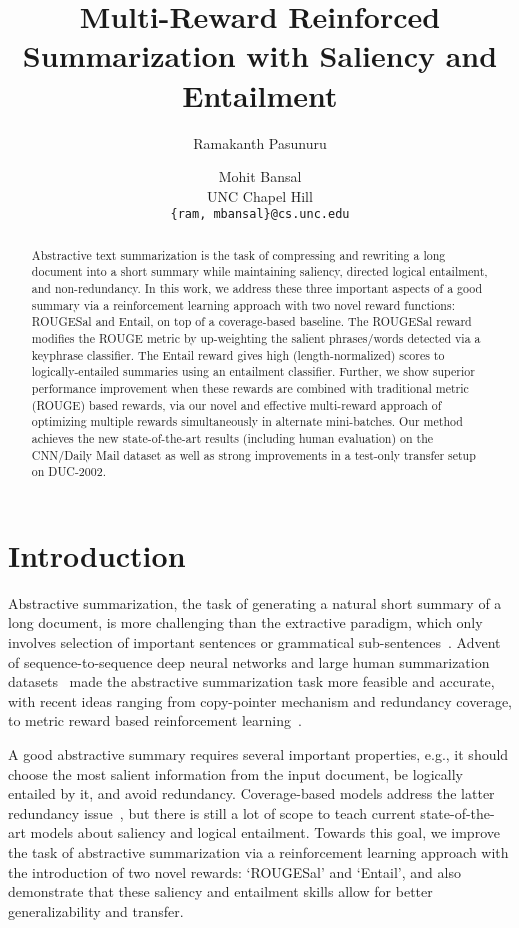 \documentclass[11pt,a4paper]{article}
\title{Multi-Reward Reinforced Summarization with Saliency and Entailment}
\author{Ramakanth Pasunuru \and Mohit Bansal \\
  UNC Chapel Hill \\
  {\tt \{ram, mbansal\}@cs.unc.edu} \\
 }
\date{}
\begin{document}
\maketitle
\begin{abstract}
Abstractive text summarization is the task of compressing and rewriting a long document into a short summary while maintaining saliency, directed logical entailment, and non-redundancy. In this work, we address these three important aspects of a good summary via a reinforcement learning approach with two novel reward functions: ROUGESal and Entail, on top of a coverage-based baseline. The ROUGESal reward modifies the ROUGE metric by up-weighting the salient phrases/words detected via a keyphrase classifier. The Entail reward gives high (length-normalized) scores to logically-entailed summaries using an entailment classifier. Further, we show superior performance improvement when these rewards are combined with traditional metric (ROUGE) based rewards, via our novel and effective multi-reward approach of optimizing multiple rewards simultaneously in alternate mini-batches. Our method achieves the new state-of-the-art results (including human evaluation) on the CNN/Daily Mail dataset as well as strong improvements in a test-only transfer setup on DUC-2002.





\end{abstract}

\section{Introduction}
\label{sec-intro}


Abstractive summarization, the task of generating a natural short summary of a long document, is more challenging than the extractive paradigm, which only involves selection of important sentences or grammatical sub-sentences~\cite{jing2000sentence,knight2002summarization,clarke2008global,filippova2015sentence}. Advent of sequence-to-sequence deep neural networks and large human summarization datasets~\cite{hermann2015teaching,nallapati2016abstractive} made the abstractive summarization task more feasible and accurate,  with recent ideas ranging from copy-pointer mechanism and redundancy coverage, to metric reward based reinforcement learning~\cite{rush2015neural,chopra2016abstractive,ranzato2015sequence,nallapati2016abstractive,see2017get}.

A good abstractive summary requires several important properties, e.g., it should choose the most salient information from the input document, be logically entailed by it, and avoid redundancy. Coverage-based models address the latter redundancy issue~\cite{Suzuki2016Summ,nallapati2016abstractive,see2017get}, but there is still a lot of scope to teach current state-of-the-art models about  saliency and logical entailment.
Towards this goal, we improve the task of abstractive summarization via a reinforcement learning approach with the introduction of two novel rewards: `ROUGESal' and `Entail', and also demonstrate that these saliency and entailment skills allow for better generalizability and transfer.
\end{document}
